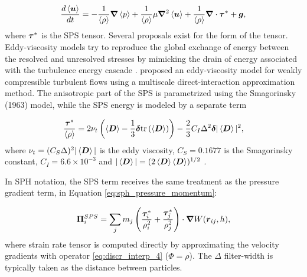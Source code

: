 %
\begin{equation} \label{eq:navier_momentum_filtered}
		\frac{d\left\langle\boldsymbol{u}\right\rangle}{dt}= -\frac{1}{\left\langle\rho\right\rangle}\boldsymbol{\nabla}\left\langle p\right\rangle + \frac{1}{\left\langle\rho\right\rangle}\mu \boldsymbol{\nabla}^2\left\langle\boldsymbol{u}\right\rangle + \frac{1}{\left\langle\rho\right\rangle} \boldsymbol{\nabla}\cdot\boldsymbol{\tau}^* + \boldsymbol{g},
\end{equation}
%
where $\boldsymbol{\tau}^*$ is the \ac{SPS} tensor. Several proposals exist for the form of the tensor. Eddy-viscosity models try to reproduce the global exchange of energy between the resolved and unresolved stresses by mimicking the drain of energy associated with the turbulence energy cascade \citep{Batchelor-2000}. \cite{Yoshizawa-1986} proposed an eddy-viscosity model for weakly compressible turbulent flows using a multiscale direct-interaction approximation method. The anisotropic part of the \ac{SPS} is parametrized using the Smagorinsky (1963) model, while the \ac{SPS} energy is modeled by a  separate term

%
\begin{equation} \label{eq:sph_sps_visc}
	\frac{\boldsymbol{\tau}^*}{\left\langle\rho\right\rangle} = 2\nu_t \left( \left\langle\boldsymbol{D}\right\rangle - \frac{1}{3}\boldsymbol{\delta}\text{tr}\left(\left\langle\boldsymbol{D}\right\rangle\right) \right) - \frac{2}{3}C_I \Delta^2\boldsymbol{\delta}|\left\langle\boldsymbol{D}\right\rangle|^2,
\end{equation}
%
where $\nu_t=(C_S\Delta)^2|\left\langle\boldsymbol{D}\right\rangle|$ is the eddy viscosity, $C_S=0.1677$ is the Smagorinsky constant, $C_I=6.6\times10^{-3}$ and  $|\left\langle\boldsymbol{D}\right\rangle|=(2\left\langle\boldsymbol{D}\right\rangle\left\langle\boldsymbol{D}\right\rangle)^{1/2}$ \citep{Martin-al-2000}.

 
In \ac{SPH} notation, the \ac{SPS} term receives the same treatment as the pressure gradient term, in Equation \eqref{eq:sph_pressure_momentum}:

%
 \begin{equation} \label{eq:sph_sps_term}
\boldsymbol{\Pi}^{SPS}_{i} = \sum_j{m_j \left( \frac{\boldsymbol{\tau}^*_i}{\rho_i^2} +\frac{\boldsymbol{\tau}^*_j}{\rho_j^2}\right) \cdot \boldsymbol{\nabla} W(\boldsymbol{r}_{ij}, h)},
\end{equation}
%
where strain rate tensor is computed directly by approximating the velocity gradients with operator \eqref{eq:discr_interp_4} ($\Phi=\rho$). The $\Delta$ filter-width is typically taken as the distance between particles.


